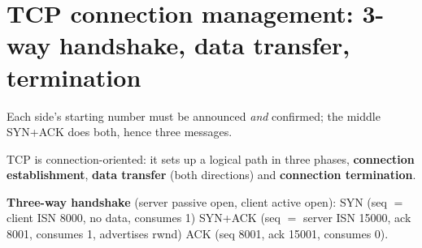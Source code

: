 \section{TCP connection management: 3-way handshake, data transfer, termination}\label{sec:T20}
  

\begin{intuitionbox}
Each side's starting number must be announced \emph{and} confirmed; the middle SYN+ACK does both, hence three messages.
\end{intuitionbox}

TCP is connection-oriented: it sets up a logical path in three phases, \textbf{connection establishment}, \textbf{data transfer} (both directions) and \textbf{connection termination}. 

\textbf{Three-way handshake} (server passive open, client active open):  SYN (seq $=$ client ISN 8000, no data, consumes 1)  SYN+ACK (seq $=$ server ISN 15000, ack 8001, consumes 1, advertises rwnd)  ACK (seq 8001, ack 15001, consumes 0).

